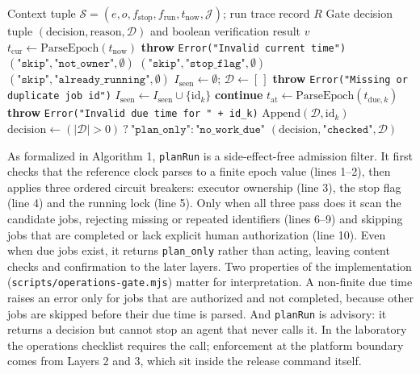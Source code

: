 \documentclass[11pt,a4paper]{article}
\theoremstyle{definition}
\begin{document}
\begin{algorithm}[htbp]
\caption{Deterministic Sole-Operator \& Temporal Scheduling Gate (\texttt{planRun} \& \texttt{verifyScheduledRun})}
\label{alg:planrun}
\footnotesize
\begin{algorithmic}[1]
\Require Context tuple $\mathcal{S} = (e, o, f_{\text{stop}}, f_{\text{run}}, t_{\text{now}}, \mathcal{J})$; run trace record $R$
\Ensure Gate decision tuple $(\text{decision}, \text{reason}, \mathcal{D})$ and boolean verification result $v$
\State $t_{\text{cur}} \gets \text{ParseEpoch}(t_{\text{now}})$
 \textbf{throw} \texttt{Error("Invalid current time")} \EndIf
{} \Return $(\texttt{"skip"}, \texttt{"not\_owner"}, \emptyset)$ \EndIf
{} \Return $(\texttt{"skip"}, \texttt{"stop\_flag"}, \emptyset)$ \EndIf
{} \Return $(\texttt{"skip"}, \texttt{"already\_running"}, \emptyset)$ \EndIf
\State $I_{\text{seen}} \gets \emptyset$; $\mathcal{D} \gets [\,]$
     \textbf{throw} \texttt{Error("Missing or duplicate job id")} \EndIf
    \State $I_{\text{seen}} \gets I_{\text{seen}} \cup \{\text{id}_k\}$
     \textbf{continue} \EndIf
    \State $t_{\text{at}} \gets \text{ParseEpoch}(t_{\text{due},k})$
     \textbf{throw} \texttt{Error("Invalid due time for " + id\_k)} \EndIf
     $\text{Append}(\mathcal{D}, \text{id}_k)$ \EndIf
\EndFor
\State $\text{decision} \gets (|\mathcal{D}| > 0)\ ?\ \texttt{"plan\_only"} : \texttt{"no\_work\_due"}$
\State \Return $(\text{decision}, \texttt{"checked"}, \mathcal{D})$
\end{algorithmic}
\end{algorithm}

As formalized in Algorithm 1, \texttt{planRun} is a side-effect-free admission filter. It first checks that the reference clock parses to a finite epoch value (lines 1--2), then applies three ordered circuit breakers: executor ownership (line 3), the stop flag (line 4) and the running lock (line 5). Only when all three pass does it scan the candidate jobs, rejecting missing or repeated identifiers (lines 6--9) and skipping jobs that are completed or lack explicit human authorization (line 10). Even when due jobs exist, it returns \texttt{plan\_only} rather than acting, leaving content checks and confirmation to the later layers. Two properties of the implementation (\texttt{scripts/\allowbreak{}operations-\allowbreak{}gate.\allowbreak{}mjs}) matter for interpretation. A non-finite due time raises an error only for jobs that are authorized and not completed, because other jobs are skipped before their due time is parsed. And \texttt{planRun} is advisory: it returns a decision but cannot stop an agent that never calls it. In the laboratory the operations checklist requires the call; enforcement at the platform boundary comes from Layers 2 and 3, which sit inside the release command itself.
\end{document}
